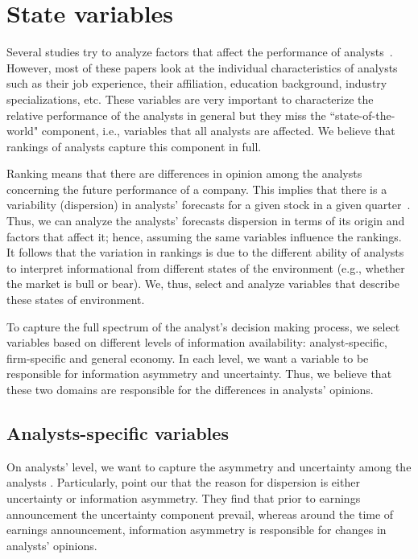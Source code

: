 \section{State variables}
\label{ch4-sec:vvs}
Several studies try to analyze  factors that affect the performance of analysts~\citep{clement1999,brown2003,jegadeesh2004}.  However, most of these papers look at the individual characteristics of analysts such as their job experience, their affiliation,  education background, industry specializations, etc. These variables are very important to characterize the relative performance of the analysts in general but they miss the ``state-of-the-world" component, i.e., variables that all analysts are affected. We believe that rankings of analysts capture this component in full.

Ranking means that there are differences in opinion among the analysts concerning the future performance of a company.  This implies that there is  a variability (dispersion) in analysts' forecasts for a given stock in a given quarter~\citep{diether2002}. Thus, we can analyze  the analysts' forecasts dispersion in terms of its origin and factors that affect it; hence, assuming the same variables influence the rankings. It follows that the variation in rankings is due to the different ability of  analysts to interpret informational from different states of the environment (e.g., whether the market is bull or bear). We, thus, select and analyze variables that describe these states of  environment.

To capture the full spectrum of the analyst's decision making process, we select  variables based on different levels of information availability: analyst-specific,  firm-specific  and general economy. In each level, we want a variable to be responsible for information asymmetry and uncertainty. Thus, we believe that these two domains are responsible for the differences in analysts' opinions.

\subsection{Analysts-specific variables}
On analysts' level, we want to capture the asymmetry and uncertainty among the analysts \citep{barron1998,barron2009,zhang2006,sheng2012}. Particularly, \cite{barron2009} point our that the reason for dispersion is either uncertainty or information asymmetry. They find that prior to earnings announcement the uncertainty component prevail, whereas around the time of earnings announcement, information asymmetry is responsible for changes in analysts' opinions.

